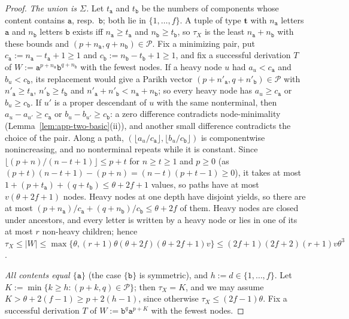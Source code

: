 \begin{proof}
\emph{The union is $\Sigma$.}  Let $t_{\mathtt a}$ and $t_{\mathtt b}$ be the
numbers of components whose content contains $\mathtt a$, resp.\ $\mathtt b$; both
lie in $\{1,\dots,f\}$.  A tuple of type $\mathbf t$ with $n_{\mathtt a}$ letters $\mathtt a$
and $n_{\mathtt b}$ letters $\mathtt b$ exists iff $n_{\mathtt a}\ge t_{\mathtt a}$ and
$n_{\mathtt b}\ge t_{\mathtt b}$, so $\tau_X$ is the least
$n_{\mathtt a}+n_{\mathtt b}$ with these bounds and
$(p+n_{\mathtt a},q+n_{\mathtt b})\in\mathcal P$.  Fix a minimizing pair, put
$c_{\mathtt a}:=n_{\mathtt a}-t_{\mathtt a}+1\ge1$ and
$c_{\mathtt b}:=n_{\mathtt b}-t_{\mathtt b}+1\ge1$, and fix a successful derivation
$T$ of $W:=\mathtt a^{p+n_{\mathtt a}}\mathtt b^{q+n_{\mathtt b}}$ with the fewest
nodes.  If a heavy node $u$ had $a_u<c_{\mathtt a}$ and $b_u<c_{\mathtt b}$, its
replacement would give a Parikh vector $(p+n'_{\mathtt a},q+n'_{\mathtt b})\in\mathcal
P$ with $n'_{\mathtt a}\ge t_{\mathtt a}$, $n'_{\mathtt b}\ge t_{\mathtt b}$ and
$n'_{\mathtt a}+n'_{\mathtt b}<n_{\mathtt a}+n_{\mathtt b}$; so every heavy node has
$a_u\ge c_{\mathtt a}$ or $b_u\ge c_{\mathtt b}$.  If $u'$ is a proper descendant of
$u$ with the same nonterminal, then $a_u-a_{u'}\ge c_{\mathtt a}$ or
$b_u-b_{u'}\ge c_{\mathtt b}$: a zero difference contradicts node-minimality
(Lemma~\ref{lem:app-two-basic}(ii)), and another small difference contradicts
the choice of the pair.  Along a path, $(\lfloor a_u/c_{\mathtt a}\rfloor,
\lfloor b_u/c_{\mathtt b}\rfloor)$ is componentwise nonincreasing, and no
nonterminal repeats while it is constant.  Since
$\lfloor(p+n)/(n-t+1)\rfloor\le p+t$ for $n\ge t\ge1$ and $p\ge0$ (as $(p+t)(n-t+1)-(p+n)=(n-t)(p+t-1)\ge0$), it
takes at most $1+(p+t_{\mathtt a})+(q+t_{\mathtt b})\le\theta+2f+1$ values, so paths
have at most $v(\theta+2f+1)$ nodes.  Heavy nodes at one depth have disjoint yields,
so there are at most $(p+n_{\mathtt a})/c_{\mathtt a}+(q+n_{\mathtt b})/c_{\mathtt
b}\le\theta+2f$ of them.  Heavy nodes are closed under ancestors, and every letter
is written by a heavy node or lies in one of its at most $r$ non-heavy
children; hence
$\tau_X\le|W|\le\max\{\theta,(r+1)\theta(\theta+2f)(\theta+2f+1)v\}\le(2f+1)(2f+2)(r+1)v\theta^3$.

\emph{All contents equal $\{\mathtt a\}$} (the case $\{\mathtt b\}$ is symmetric),
and $h:=d\in\{1,\dots,f\}$.  Let $K:=\min\{k\ge h:(p+k,q)\in\mathcal P\}$; then
$\tau_X=K$, and we may assume $K>\theta+2(f-1)\ge p+2(h-1)$, since otherwise
$\tau_X\le(2f-1)\theta$.  Fix a successful derivation
$T$ of $W:=\mathtt b^q\mathtt a^{p+K}$ with the fewest nodes.


\end{proof}
